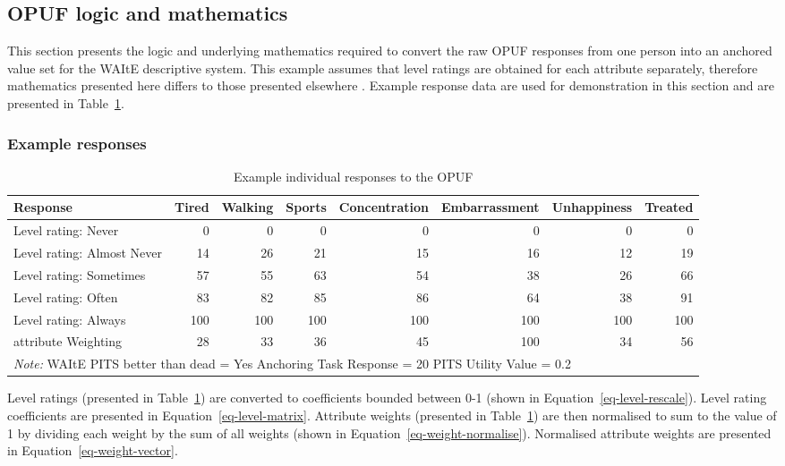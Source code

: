 \documentclass[
  number,
  preprint]{elsarticle}
\begin{document}
\subsection{OPUF logic and mathematics}\label{sec-OPUF_methods}

This section presents the logic and underlying mathematics required to
convert the raw OPUF responses from one person into an anchored value
set for the WAItE descriptive system. This example assumes that level
ratings are obtained for each attribute separately, therefore
mathematics presented here differs to those presented elsewhere
\citep{Schneider2022TheStates}. Example response data are used for
demonstration in this section and are presented in
Table~\ref{tbl-exampledata}.

\subsubsection{Example responses}\label{example-responses}

\begin{longtable}[t]{lrrrrrrr}

\caption{\label{tbl-exampledata}Example individual responses to the
OPUF}

\tabularnewline

\toprule
Response & Tired & Walking & Sports & Concentration & Embarrassment & Unhappiness & Treated\\
\midrule
Level rating: Never & 0 & 0 & 0 & 0 & 0 & 0 & 0\\
Level rating: Almost Never & 14 & 26 & 21 & 15 & 16 & 12 & 19\\
Level rating: Sometimes & 57 & 55 & 63 & 54 & 38 & 26 & 66\\
Level rating: Often & 83 & 82 & 85 & 86 & 64 & 38 & 91\\
Level rating: Always & 100 & 100 & 100 & 100 & 100 & 100 & 100\\
\addlinespace
attribute Weighting & 28 & 33 & 36 & 45 & 100 & 34 & 56\\
\bottomrule
\multicolumn{8}{l}{\rule{0pt}{1em}\textit{Note: } WAItE PITS better than dead = Yes Anchoring Task Response = 20 PITS Utility Value = 0.2}\\

\end{longtable}

Level ratings (presented in Table~\ref{tbl-exampledata}) are converted
to coefficients bounded between 0-1 (shown in
Equation~\ref{eq-level-rescale}). Level rating coefficients are
presented in Equation~\ref{eq-level-matrix}. Attribute weights
(presented in Table~\ref{tbl-exampledata}) are then normalised to sum to
the value of 1 by dividing each weight by the sum of all weights (shown
in Equation~\ref{eq-weight-normalise}). Normalised attribute weights are
presented in Equation~\ref{eq-weight-vector}.
\end{document}
